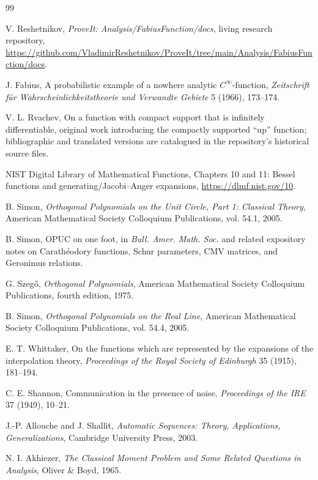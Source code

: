 \documentclass[11pt,oneside]{article}
\theoremstyle{definition}
\begin{document}
\begin{thebibliography}{99}

V. Reshetnikov,
\emph{ProveIt: Analysis/FabiusFunction/docs}, living research repository,
\url{https://github.com/VladimirReshetnikov/ProveIt/tree/main/Analysis/FabiusFunction/docs}.

J. Fabius,
A probabilistic example of a nowhere analytic \(C^\infty\)-function,
\emph{Zeitschrift f\"ur Wahrscheinlichkeitstheorie und Verwandte Gebiete} 5 (1966), 173--174.

V. L. Rvachev,
On a function with compact support that is infinitely differentiable,
original work introducing the compactly supported ``up'' function; bibliographic and
translated versions are catalogued in the repository's historical source files.

NIST Digital Library of Mathematical Functions,
Chapters 10 and 11: Bessel functions and generating/Jacobi--Anger expansions,
\url{https://dlmf.nist.gov/10}.

B. Simon,
\emph{Orthogonal Polynomials on the Unit Circle, Part 1: Classical Theory},
American Mathematical Society Colloquium Publications, vol. 54.1, 2005.

B. Simon,
OPUC on one foot,
in \emph{Bull. Amer. Math. Soc.} and related expository notes on Carath\'eodory functions,
Schur parameters, CMV matrices, and Geronimus relations.

G. Szeg\H{o},
\emph{Orthogonal Polynomials},
American Mathematical Society Colloquium Publications, fourth edition, 1975.

B. Simon,
\emph{Orthogonal Polynomials on the Real Line},
American Mathematical Society Colloquium Publications, vol. 54.4, 2005.

E. T. Whittaker,
On the functions which are represented by the expansions of the interpolation theory,
\emph{Proceedings of the Royal Society of Edinburgh} 35 (1915), 181--194.

C. E. Shannon,
Communication in the presence of noise,
\emph{Proceedings of the IRE} 37 (1949), 10--21.

J.-P. Allouche and J. Shallit,
\emph{Automatic Sequences: Theory, Applications, Generalizations},
Cambridge University Press, 2003.

N. I. Akhiezer,
\emph{The Classical Moment Problem and Some Related Questions in Analysis},
Oliver \& Boyd, 1965.

\end{thebibliography}
\end{document}
